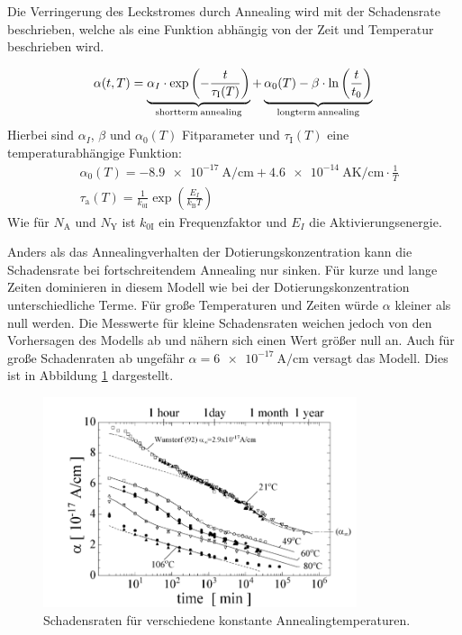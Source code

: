 Die Verringerung des Leckstromes durch Annealing wird mit der Schadensrate
beschrieben, welche als eine Funktion abhängig von der Zeit und
Temperatur beschrieben wird.\cite{moll}

\begin{align}
  \alpha(t, T) = \underbrace{\alpha_I \cdot \exp{\left(-\frac{t}{\tau_{\mathrm{I}}(T)}\right)}}_{\mathrm{shortterm \: annealing}} + \underbrace{\alpha_{\mathrm{0}}(T) -\beta \cdot \ln{\left(\frac{t}{t_{\mathrm{0}}}\right)}}_{\mathrm{longterm \: annealing}} \text{\label{eqn:damage}}
\end{align}
Hierbei sind $\alpha_I$, $\beta$ und $\alpha_{\mathrm{0}}(T)$ Fitparameter und $\tau_{\mathrm{I}}(T)$ eine
temperaturabhängige Funktion:
\begin{align}
  &\alpha_{\mathrm{0}}(T) = \SI{-8.9e-17}{\ampere\per\centi\meter} + \SI{4.6e-14}{\ampere\kelvin\per\centi\meter} \cdot \frac{1}{T} \\
  &\tau_{\mathrm{a}}(T) = \frac{1}{k_{0\mathrm{I}}}\exp{\left(\frac{E_{I}}{k_{\mathrm{B}}T}\right)}
\end{align}
Wie für $N_{\mathrm{A}}$ und $N_{\mathrm{Y}}$ ist $k_{0\mathrm{I}}$ ein Frequenzfaktor und $E_{I}$ die Aktivierungsenergie.

Anders als das Annealingverhalten der Dotierungskonzentration kann die Schadensrate
bei fortschreitendem Annealing nur sinken. Für kurze und
lange Zeiten dominieren in diesem Modell wie bei der Dotierungskonzentration unterschiedliche
Terme. Für große Temperaturen und Zeiten würde $\alpha$ kleiner als null
werden. Die Messwerte für kleine Schadensraten weichen jedoch von den
Vorhersagen des Modells ab und nähern sich einen Wert größer null an. Auch für große Schadenraten ab ungefähr $\alpha=\SI{6e-17}{\ampere\per\centi\meter}$
versagt das Modell.
Dies ist in Abbildung \ref{fig:damage_rates} dargestellt.

\begin{figure}
  \centering
  \includegraphics[width=0.82\textwidth]{logos/schadensraten.PNG}
  \caption{Schadensraten für verschiedene konstante Annealingtemperaturen.\cite{moll}}
  \label{fig:damage_rates}
\end{figure}
